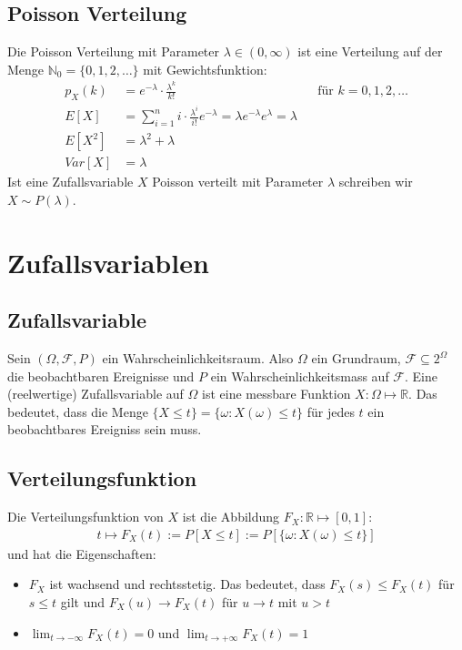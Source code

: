 \documentclass[8pt]{extarticle}
\newcommand{\N}{\mathbb{N}}
\newcommand{\R}{\mathbb{R}}
\newcommand{\F}{\mathcal{F}}
\newcommand{\ra}{\rightarrow}
\newcommand{\Sn}{\sum_{i = 1}^n}
\begin{document}
\begin{multicols*}{3}
  \subsection*{Poisson Verteilung}
  Die Poisson Verteilung mit Parameter $\lambda \in  (0, \infty)$ ist eine
  Verteilung auf der Menge $\N_0 = \{0, 1, 2, \dots\}$ mit Gewichtsfunktion:
  \begin{align*}
    p_X (k) & = e^{-\lambda} \cdot \frac{\lambda^k}{k!}
           &                                                                                            & \text{für } k = 0, 1, 2, \dots \\
    E[X]   & = \Sn i \cdot \frac{\lambda^i}{i!} e^{-\lambda} = \lambda e^{-\lambda} e^\lambda = \lambda                                  \\
    E[X^2] & = \lambda^2 + \lambda                                                                                                       \\
    Var[X] & = \lambda
  \end{align*}
  Ist eine Zufallsvariable $X$ Poisson verteilt mit Parameter $\lambda$
  schreiben wir $X \sim P (\lambda)$.
  \hypertarget{sec:2}{\section{Zufallsvariablen}}
  \subsection*{Zufallsvariable}
  Sein $ (\Omega, \F, P)$ ein Wahrscheinlichkeitsraum. Also $\Omega$ ein
  Grundraum, $\F \subseteq 2^\Omega$ die beobachtbaren Ereignisse und $P$ ein
  Wahrscheinlichkeitsmass auf $\F$. Eine  (reelwertige) Zufallsvariable auf
  $\Omega$ ist eine messbare Funktion $X : \Omega \mapsto \R$. Das bedeutet, dass
  die Menge $\{X \leq t\} = \{\omega : X (\omega) \leq t\}$ für jedes $t$ ein
  beobachtbares Ereigniss sein muss.
  \subsection*{Verteilungsfunktion}
  Die Verteilungsfunktion von $X$ ist die Abbildung $F_X : \R \mapsto [0, 1]$:
  \begin{align*}
    t \mapsto F_X (t) := P[X \leq t] := P[\{\omega : X (\omega) \leq t\}]
  \end{align*}
  und hat die Eigenschaften:
  \begin{itemize}
    \item $F_X$ ist wachsend und rechtsstetig. Das bedeutet,
          dass $F_X (s) \leq F_X (t)$ für $s \leq t$ gilt und $F_X (u) \ra F_X (t)$
          für $u \ra t$ mit $u > t$
    \item $\lim_{t \ra - \infty} F_X (t) = 0$ und $\lim_{t \ra + \infty} F_X (t) = 1$
  \end{itemize}

\end{multicols*}
\end{document}
